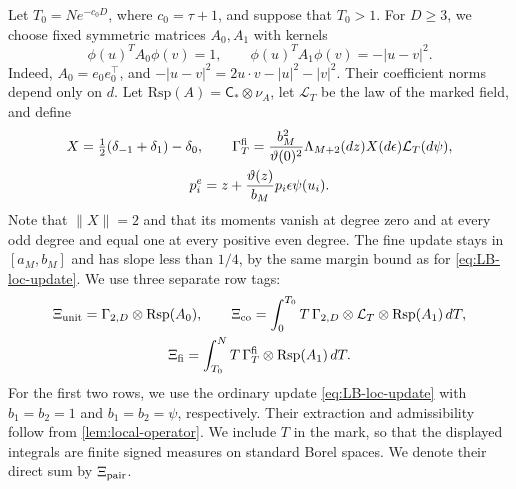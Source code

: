 Let $T_0=Ne^{-c_0D}$, where $c_0=\tau+1$, and suppose that $T_0>1$.
For $D\ge3$, we choose fixed symmetric matrices $A_0,A_1$ with
kernels
\[
 \phi(u)^TA_0\phi(v)=1,\qquad
 \phi(u)^TA_1\phi(v)=-|u-v|^2.
\]
Indeed, $A_0=e_0e_0^\top$, and $-|u-v|^2=2u\cdot v-|u|^2-|v|^2$.
Their coefficient norms depend only on $d$. Let
$\mathrm{Rsp}(A)=\mathsf C_*\otimes\nu_A$, let $\mathcal L_T$ be the
law of the marked field, and define
\begin{equation}\label{eq:new-pair-packet}
 \begin{gathered}
 X=\tfrac12(\delta_{-1}+\delta_1)-\delta_0,\qquad
 \Gamma_T^{\rm fi}
 =\frac{b_M^2}{\vartheta(0)^2}
   \Lambda_{M+2}(dz)X(d\epsilon)\mathcal L_T(d\psi),\\
 p_i^e=z+\frac{\vartheta(z)}{b_M}p_i\epsilon\psi(u_i).
 \end{gathered}
\end{equation}
Note that $\|X\|=2$ and that its moments vanish at degree zero and
at every odd degree and equal one at every positive even degree. The fine
update stays in $[a_M,b_M]$ and has slope less than $1/4$, by the same
margin bound as for \eqref{eq:LB-loc-update}. We use three
separate row tags:
\begin{equation}\label{eq:new-pair-rows}
 \begin{gathered}
 \Xi_{\rm unit}=\Gamma_{2,D}\otimes\mathrm{Rsp}(A_0),\qquad
 \Xi_{\rm co}=\int_0^{T_0}T\,
   \Gamma_{2,D}\otimes\mathcal L_T\otimes\mathrm{Rsp}(A_1)\,dT,
 \\
 \Xi_{\rm fi}=\int_{T_0}^NT\,
   \Gamma_T^{\rm fi}\otimes\mathrm{Rsp}(A_1)\,dT.
 \end{gathered}
\end{equation}
For the first two rows, we use the ordinary update
\eqref{eq:LB-loc-update} with $b_1=b_2=1$ and $b_1=b_2=\psi$,
respectively. Their extraction and admissibility follow from
\cref{lem:local-operator}. We include $T$ in the mark, so that the
displayed integrals are finite signed measures on standard Borel
spaces. We denote their direct sum by $\Xi_{\rm pair}$.

